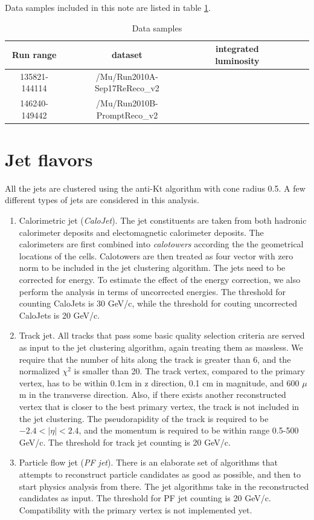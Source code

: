 \documentclass{cmspaper2}
\begin{document}
Data samples included in this note are listed in table \ref{Table_DataSamples}.

\begin{table}[h]
   \caption{Data samples}
   \centering
   \begin{tabular}{|c|c|c|c|c|c|}
   \hline
   Run range & dataset & integrated luminosity \\\hline
   135821-144114 & /Mu/Run2010A-Sep17ReReco\_v2 &  \\\hline
   146240-149442 & /Mu/Run2010B-PromptReco\_v2 &  \\\hline
   \end{tabular}
   \label{Table_DataSamples}
\end{table}

\section{Jet flavors}

All the jets are clustered using the anti-Kt algorithm with cone radius 0.5.  A few different types of jets are considered in
this analysis.

\begin{enumerate}
\item Calorimetric jet (\emph{CaloJet}).  The jet constituents are taken from both hadronic calorimeter deposits and electomagnetic calorimeter deposits.
   The calorimeters are first combined into \emph{calotowers} according the the geometrical locations of the cells.
   Calotowers are then treated as four vector with zero norm to be included in the jet clustering algorithm.
   The jets need to be corrected for energy.  To estimate the effect of the energy correction, we also perform the analysis in terms of uncorrected energies.
   The threshold for counting CaloJets is 30 GeV/c, while the threshold for couting uncorrected CaloJets is 20 GeV/c.
\item Track jet.  All tracks that pass some basic quality selection criteria are served as input to the jet clustering algorithm, again treating them as massless.
   We require that the number of hits along the track is greater than 6, and the normalized $\chi^2$ is smaller than 20.
   The track vertex, compared to the primary vertex, has to be within 0.1cm in z direction, 0.1 cm in magnitude, and 600 $\mu$m in the transverse direction.
   Also, if there exists another reconstructed vertex that is closer to the best primary vertex, the track is not included in the jet clustering.
   The pseudorapidity of the track is required to be $-2.4 < |\eta| < 2.4$, and the momentum is required to be within range 0.5-500 GeV/c.
   The threshold for track jet counting is 20 GeV/c.
\item Particle flow jet (\emph{PF jet}).  There is an elaborate set of algorithms that attempts to reconstruct particle candidates as good as possible,
   and then to start physics analysis from there.  The jet algorithms take in the reconstructed candidates as input.
   The threshold for PF jet counting is 20 GeV/c.  Compatibility with the primary vertex is not implemented yet.
\end{enumerate}
\end{document}
